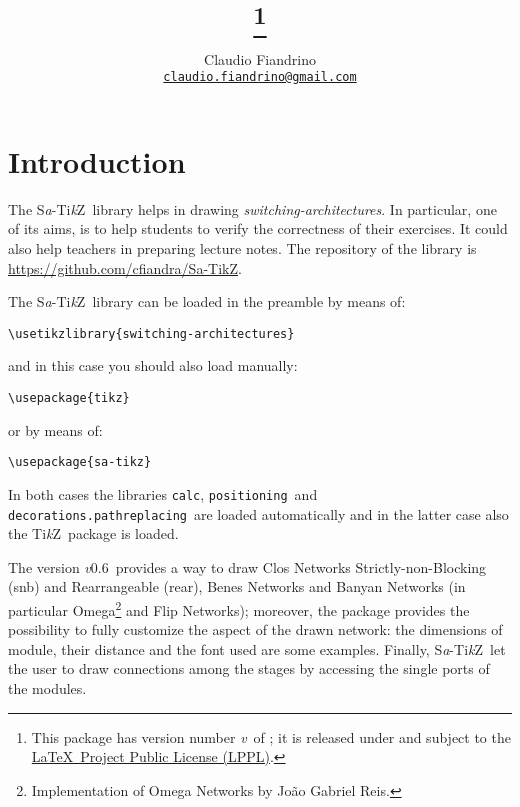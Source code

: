 \documentclass{ltxdoc}
\title{\saTikZ\footnote{This package has version number \textit{v}\version\ of \versiondate; it is released under and subject to the \href{http://www.latex-project.org/lppl/}{\LaTeX\ Project Public License (LPPL)}.}}
\author{Claudio Fiandrino \\ \small\href{mailto:claudio.fiandrino@gmail.com}{\texttt{claudio.fiandrino@gmail.com}}}
\date{\versiondate}
\newcommand\Tikz{Ti\textit kZ}
\newcommand{\saTikZ}{S\textit{a}-\Tikz}
\newcommand{\version}{0.6}
\begin{document}
\maketitle
\tableofcontents

\section*{Introduction}
The \saTikZ\ library helps in drawing \emph{switching-architectures}. In particular, one of its aims, is to help students to verify the correctness of their exercises. It could also help teachers in preparing lecture notes. The repository of the library is \href{https://github.com/cfiandra/Sa-TikZ}{https://github.com/cfiandra/Sa-TikZ}.

The \saTikZ\ library can be loaded in the preamble by means of:
\begin{flushleft}
\verb|\usetikzlibrary{|\bgroup\color{red!75!black}\verb|switching-architectures|\egroup\verb|}|
\end{flushleft}
and in this case you should also load manually:
\begin{flushleft}
\verb|\usepackage{|\bgroup\color{red!75!black}\verb|tikz|\egroup\verb|}|
\end{flushleft}
or by means of:
\begin{flushleft}
\verb|\usepackage{|\bgroup\color{red!75!black}\verb|sa-tikz|\egroup\verb|}|
\end{flushleft}
In both cases the libraries \bgroup\color{red!75!black}\verb|calc|\egroup{}, \bgroup\color{red!75!black}\verb|positioning|\egroup\ and \bgroup\color{red!75!black}\verb|decorations.pathreplacing|\egroup\ are loaded automatically and in the latter case also the \Tikz\ package is loaded.

The version \textit{v}\version\ provides a way to draw Clos Networks Strictly-non-Blocking (snb) and Rearrangeable (rear), Benes Networks and Banyan Networks (in particular Omega\footnote{Implementation of Omega Networks by João Gabriel Reis.} and Flip Networks); moreover, the package provides the possibility to fully customize the aspect of the drawn network: the dimensions of module, their distance and the font used are some examples. Finally, \saTikZ\ let the user to draw connections among the stages by accessing the single ports of the modules.
\end{document}
